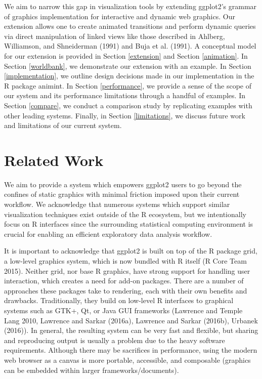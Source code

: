 \documentclass[12pt,]{article}
\theoremstyle{definition}
\theoremstyle{definition}
\theoremstyle{remark}
\begin{document}
We aim to narrow this gap in visualization tools by extending ggplot2's
grammar of graphics implementation for interactive and dynamic web
graphics. Our extension allows one to create animated transitions and
perform dynamic queries via direct manipulation of linked views like
those described in Ahlberg, Williamson, and Shneiderman (1991) and Buja
et al. (1991). A conceptual model for our extension is provided in
Section \ref{extension} and Section \ref{animation}. In Section
\ref{worldbank}, we demonstrate our extension with an example. In
Section \ref{implementation}, we outline design decisions made in our
implementation in the R package animint. In Section \ref{performance},
we provide a sense of the scope of our system and its performance
limitations through a handful of examples. In Section \ref{compare}, we
conduct a comparison study by replicating examples with other leading
systems. Finally, in Section \ref{limitations}, we discuss future work
and limitations of our current system.

\section{Related Work}\label{related-work}

We aim to provide a system which empowers ggplot2 users to go beyond the
confines of static graphics with minimal friction imposed upon their
current workflow. We acknowledge that numerous systems which support
similar visualization techniques exist outside of the R ecosystem, but
we intentionally focus on R interfaces since the surrounding statistical
computing environment is crucial for enabling an efficient exploratory
data analysis workflow.

It is important to acknowledge that ggplot2 is built on top of the R
package grid, a low-level graphics system, which is now bundled with R
itself (R Core Team 2015). Neither grid, nor base R graphics, have
strong support for handling user interaction, which creates a need for
add-on packages. There are a number of approaches these packages take to
rendering, each with their own benefits and drawbacks. Traditionally,
they build on low-level R interfaces to graphical systems such as GTK+,
Qt, or Java GUI frameworks (Lawrence and Temple Lang 2010, Lawrence and
Sarkar (2016a), Lawrence and Sarkar (2016b), Urbanek (2016)). In
general, the resulting system can be very fast and flexible, but sharing
and reproducing output is usually a problem due to the heavy software
requirements. Although there may be sacrifices in performance, using the
modern web browser as a canvas is more portable, accessible, and
composable (graphics can be embedded within larger
frameworks/documents).
\end{document}
